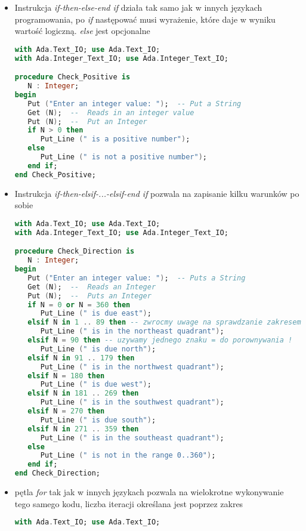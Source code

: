 \documentclass[a4paper,15pt]{article}
\begin{document}
\begin{itemize}
\item Instrukcja \textit{if-then-else-end if} działa tak samo jak w innych językach programowania, po \textit{if} następować musi wyrażenie, które daje w wyniku wartość logiczną. \textit{else} jest opcjonalne
\begin{lstlisting}[language=Ada, caption=if-then-else-end if]
with Ada.Text_IO; use Ada.Text_IO;
with Ada.Integer_Text_IO; use Ada.Integer_Text_IO;

procedure Check_Positive is
   N : Integer;
begin
   Put ("Enter an integer value: ");  -- Put a String
   Get (N);  --  Reads in an integer value
   Put (N);  --  Put an Integer
   if N > 0 then
      Put_Line (" is a positive number");
   else
      Put_Line (" is not a positive number");
   end if;
end Check_Positive;
\end{lstlisting}

\item Instrukcja \textit{if-then-elsif-...-elsif-end if} pozwala na zapisanie kilku warunków po sobie
\begin{lstlisting}[language=Ada, caption=if-then-elsif-...-elsif-else-end if]
with Ada.Text_IO; use Ada.Text_IO;
with Ada.Integer_Text_IO; use Ada.Integer_Text_IO;

procedure Check_Direction is
   N : Integer;
begin
   Put ("Enter an integer value: ");  -- Puts a String
   Get (N);  --  Reads an Integer
   Put (N);  --  Puts an Integer
   if N = 0 or N = 360 then
      Put_Line (" is due east");
   elsif N in 1 .. 89 then -- zwrocmy uwage na sprawdzanie zakresem !
      Put_Line (" is in the northeast quadrant");
   elsif N = 90 then -- uzywamy jednego znaku = do porownywania !
      Put_Line (" is due north");
   elsif N in 91 .. 179 then
      Put_Line (" is in the northwest quadrant");
   elsif N = 180 then
      Put_Line (" is due west");
   elsif N in 181 .. 269 then
      Put_Line (" is in the southwest quadrant");
   elsif N = 270 then
      Put_Line (" is due south");
   elsif N in 271 .. 359 then
      Put_Line (" is in the southeast quadrant");
   else
      Put_Line (" is not in the range 0..360");
   end if;
end Check_Direction;
\end{lstlisting}

\item pętla \textit{for} tak jak w innych językach pozwala na wielokrotne wykonywanie tego samego kodu, liczba iteracji określana jest poprzez zakres
\begin{lstlisting}[language=Ada, caption=Podstawowa petla for]
with Ada.Text_IO; use Ada.Text_IO;


\end{lstlisting}
\end{itemize}
\end{document}
